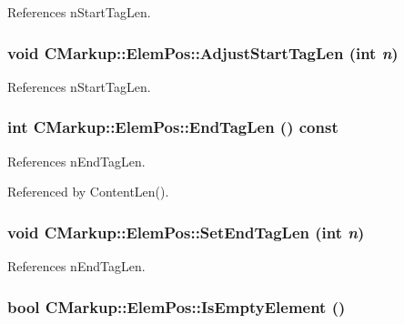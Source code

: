 References nStartTagLen.
\subsubsection[AdjustStartTagLen]{\setlength{\rightskip}{0pt plus 5cm}void CMarkup::ElemPos::AdjustStartTagLen (int {\em n})\hspace{0.3cm}{\tt  [inline]}}\label{structCMarkup_1_1ElemPos_3140f418c80056cb8aba69a270c6a71d}




References nStartTagLen.
\subsubsection[EndTagLen]{\setlength{\rightskip}{0pt plus 5cm}int CMarkup::ElemPos::EndTagLen () const\hspace{0.3cm}{\tt  [inline]}}\label{structCMarkup_1_1ElemPos_d9d0ad0c48a129555d1052e98e4f71bd}




References nEndTagLen.

Referenced by ContentLen().
\subsubsection[SetEndTagLen]{\setlength{\rightskip}{0pt plus 5cm}void CMarkup::ElemPos::SetEndTagLen (int {\em n})\hspace{0.3cm}{\tt  [inline]}}\label{structCMarkup_1_1ElemPos_e427d1e0e53cfd0fe1c278f34c585bc9}




References nEndTagLen.
\subsubsection[IsEmptyElement]{\setlength{\rightskip}{0pt plus 5cm}bool CMarkup::ElemPos::IsEmptyElement ()\hspace{0.3cm}{\tt  [inline]}}\label{structCMarkup_1_1ElemPos_97093aa0ddbd691dd00c91c945a3e98a}




